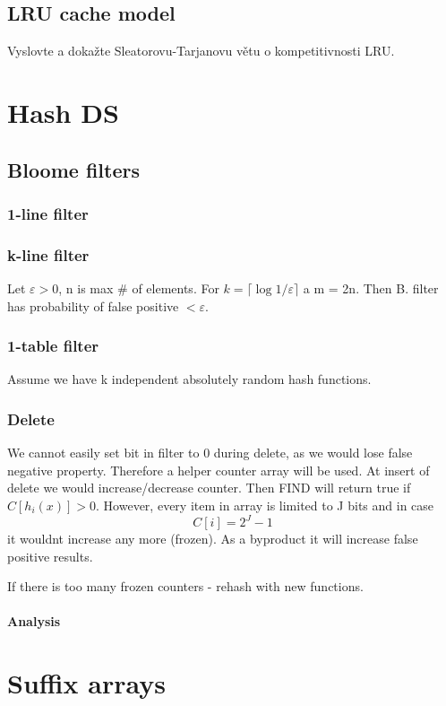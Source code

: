 \documentclass[12pt]{article}
\begin{document}
\subsection{LRU cache model}

    Vyslovte a dokažte Sleatorovu-Tarjanovu větu o kompetitivnosti LRU.

\section{Hash DS}

\subsection{Bloome filters}
\subsubsection{1-line filter}
\subsubsection{k-line filter}

Let $ \varepsilon > 0 $, n is max \# of elements. For $ k = \lceil \log 1/\varepsilon \rceil $ a m = 2n. Then B. filter has probability of false positive $ < \varepsilon $.

\subsubsection{1-table filter}
Assume we have k independent absolutely random hash functions.

\subsubsection{Delete}

We cannot easily set bit in filter to 0 during delete, as we would lose false negative property. Therefore a helper counter array will be used.
At insert of delete we would increase/decrease counter. Then FIND will return true if $ C[h_i(x)] > 0 $. However, every item in array is limited to J bits and in case \[ C[i] = 2^J-1 \] it wouldnt increase any more (frozen). As a byproduct it will increase false positive results.

If there is too many frozen counters - rehash with new functions.

\paragraph{Analysis}

\section{Suffix arrays}
\end{document}
